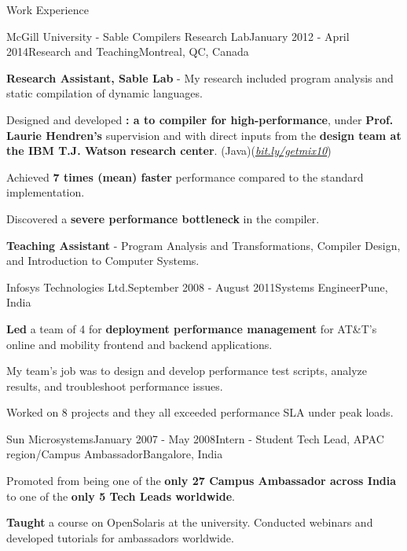 \documentclass{resume} %
\begin{document}
\begin{rSection}{Work Experience}
\begin{rSubsection}{McGill University - Sable Compilers Research Lab}{January
        2012 - April 2014}{Research and Teaching}{Montreal, QC, Canada} 
\item \textbf{Research Assistant, Sable Lab} - My research included program
        analysis and static compilation of dynamic languages.

\begin{lsubSubsection}
\item Designed and developed \textbf{\mixtenx: a \matlab to \xten  compiler for
        high-performance}, under \textbf{Prof. Laurie Hendren's} supervision
        and with direct inputs from the \textbf{\xten design team at the IBM
        T.J. Watson research center}.
        (Java)(\href{http://bit.ly/getmix10}{\em{bit.ly/getmix10}})  
 \item Achieved \textbf{7 times (mean) faster} performance compared to the
 standard \matlab implementation.
  \item Discovered a \textbf{severe performance bottleneck}
in the \xten compiler.  
\end{lsubSubsection}
\item \textbf{Teaching Assistant} - Program Analysis and Transformations,
	Compiler Design, and Introduction to Computer Systems.
\end{rSubsection}

\begin{rSubsection}{Infosys Technologies Ltd.}{September 2008 - August
        2011}{Systems Engineer}{Pune, India}
\item \textbf{Led} a team of 4 for \textbf{deployment performance management}
	for AT\&T's online and mobility frontend and backend applications.
\begin{lsubSubsection}
\item My team's job was to design and develop performance test scripts, analyze
	results, and troubleshoot performance issues.  
\item {Worked on 8 projects} and they all exceeded performance SLA under peak
	loads.
\end{lsubSubsection}
\end{rSubsection}

\begin{rSubsection}{Sun Microsystems}{January 2007 - May 2008}{Intern - Student
        Tech Lead, APAC region/Campus Ambassador}{Bangalore, India}
\item Promoted from being one of the \textbf{only 27 Campus Ambassador across
	India} to one of the \textbf{only 5 Tech Leads worldwide}.  
\begin{lsubSubsection}
\item \textbf{Taught} a course on OpenSolaris at the university. Conducted
	webinars and developed tutorials for ambassadors worldwide.
\end{lsubSubsection}
\end{rSubsection}
\end{rSection}
\end{document}
